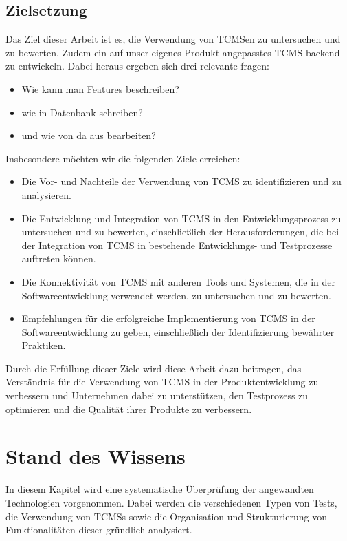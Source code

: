 \documentclass[a4paper, fontsize=11pt, parskip=half, twoside]{scrreprt}
\begin{document}
	\section{Zielsetzung}
	Das Ziel dieser Arbeit ist es, die Verwendung von \ac{TCMS}en zu untersuchen und zu bewerten. 
	Zudem ein auf unser eigenes Produkt angepasstes \ac{TCMS} backend zu entwickeln. 
	Dabei heraus ergeben sich drei relevante fragen:
	
	\begin{itemize}
		\item Wie kann man Features beschreiben? 
		\item wie in Datenbank schreiben? 
		\item und wie von da aus bearbeiten?
	\end{itemize}
	
	Insbesondere möchten wir die folgenden Ziele erreichen:
	
	\begin{itemize}
		\item Die Vor- und Nachteile der Verwendung von \ac{TCMS} zu identifizieren und zu analysieren.
		\item Die Entwicklung und Integration von \ac{TCMS} in den Entwicklungsprozess zu untersuchen und zu bewerten, einschließlich der Herausforderungen, die bei der Integration von \ac{TCMS} in bestehende Entwicklungs- und Testprozesse auftreten können.
		\item Die Konnektivität von \ac{TCMS} mit anderen Tools und Systemen, die in der Softwareentwicklung verwendet werden, zu untersuchen und zu bewerten.
		\item Empfehlungen für die erfolgreiche Implementierung von \ac{TCMS} in der Softwareentwicklung zu geben, einschließlich der Identifizierung bewährter Praktiken.
	\end{itemize}
	
	Durch die Erfüllung dieser Ziele wird diese Arbeit dazu beitragen, das Verständnis für die Verwendung von \ac{TCMS} in der Produktentwicklung zu verbessern und Unternehmen dabei zu unterstützen, den Testprozess zu optimieren und die Qualität ihrer Produkte zu verbessern.
	
	
	
	\chapter{Stand des Wissens} \label{sec:stateofart}
	In diesem Kapitel wird eine systematische Überprüfung der angewandten Technologien vorgenommen. 
	Dabei werden die verschiedenen Typen von Tests, die Verwendung von \aclp{TCMS} sowie die Organisation und Strukturierung von Funktionalitäten dieser gründlich analysiert.	
	
\end{document}
